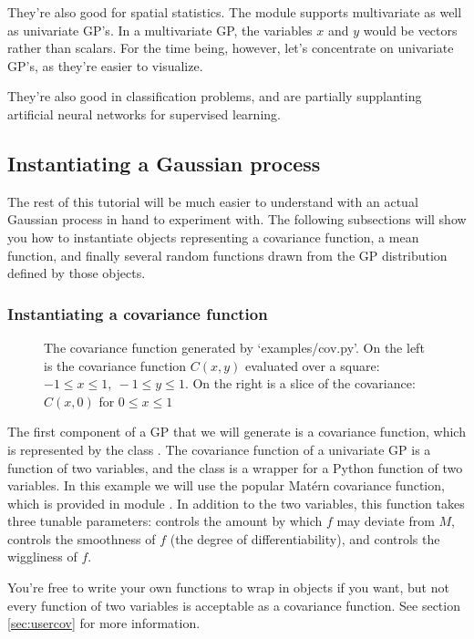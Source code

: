 \documentclass{manual}
\begin{document}
They're also good for spatial statistics. The  module supports multivariate as well as univariate GP's. In a multivariate GP, the variables $x$ and $y$ would be vectors rather than scalars. For the time being, however, let's concentrate on univariate GP's, as they're easier to visualize.

They're also good in classification problems, and are partially supplanting artificial neural networks for supervised learning.

\subsection{Instantiating a Gaussian process}\label{sub:inst}

The rest of this tutorial will be much easier to understand with an actual Gaussian process in hand to experiment with. The following subsections will show you how to instantiate objects representing a covariance function, a mean function, and finally several random functions drawn from the GP distribution defined by those objects.

\subsubsection{Instantiating a covariance function}\label{subsub:cov}
\begin{figure}
	\centering
	\caption{The covariance function generated by {\sffamily `examples/cov.py'}. On the left is the covariance function $C(x,y)$ evaluated over a square: $-1\le x\le 1,\ -1\le y\le 1$. On the right is a slice of the covariance: $C(x,0)$ for $0\le x \le 1$}
	\label{fig:cov}
\end{figure}

The first component of a GP that we will generate is a covariance function, which is represented by the class . The covariance function of a univariate GP is a function of two variables, and the  class is a wrapper for a Python function of two variables. In this example we will use the popular Mat\'ern covariance function, which is provided in module . In addition to the two variables, this function takes three tunable parameters:  controls the amount by which $f$ may deviate from $M$,  controls the smoothness of $f$ (the degree of differentiability), and  controls the wiggliness of $f$.

You're free to write your own functions to wrap in  objects if you want, but not every function of two variables is acceptable as a covariance function. See section \ref{sec:usercov} for more information.
\end{document}
